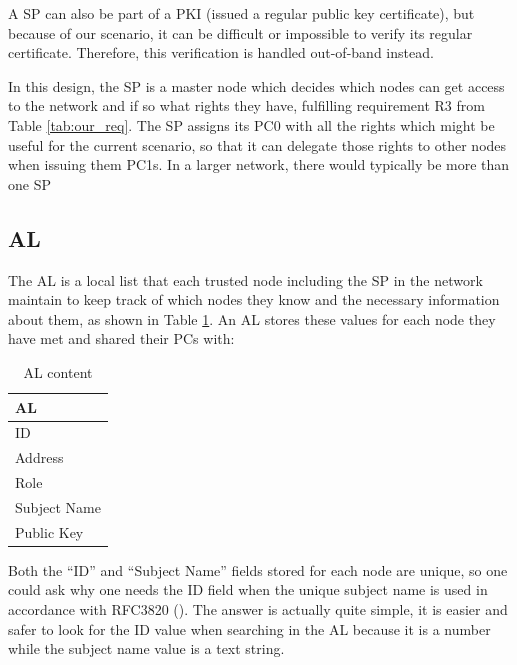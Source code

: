 A \ac{SP} can also be part of a \ac{PKI} (issued a regular public key
certificate), but because of our scenario, it can be difficult or impossible to
verify its regular certificate. Therefore, this verification is handled
out-of-band instead.

In this design, the \ac{SP} is a master node which decides which nodes can get
access to the network and if so what rights they have, fulfilling requirement R3
from Table \ref{tab:our_req}. The \ac{SP} assigns its \ac{PC0} with all the
rights which might be useful for the current scenario, so that it can delegate
those rights to other nodes when issuing them \acp{PC1}. In a larger network,
there would typically be more than one \ac{SP}

\subsection{\acl{AL}}
The \acf{AL} is a local list that each trusted node including the \ac{SP} in
the network maintain to keep track of which nodes they know and the necessary
information about them, as shown in Table \ref{tab:al_content}. An \ac{AL}
stores these values for each node they have met and shared their \acp{PC} with:
\begin{table}[h]
	\centering
	\begin{tabular}{| l |}\hline
 		\textbf{\acl{AL}}\\\hline
		ID\\\hline
		Address \\\hline
		Role \\\hline 
		Subject Name \\\hline 
		Public Key \\\hline  
	\end{tabular}
	\caption{\acf{AL} content}
	\label{tab:al_content}
\end{table}
Both the ``ID'' and ``Subject Name'' fields stored for each node are unique, so
one could ask why one needs the ID field when the unique subject name is used in
accordance with RFC3820 (\cite{rfc3820}). The answer is actually quite simple,
it is easier and safer to look for the ID value when searching in the \ac{AL}
because it is a number while the subject name value is a text string.

